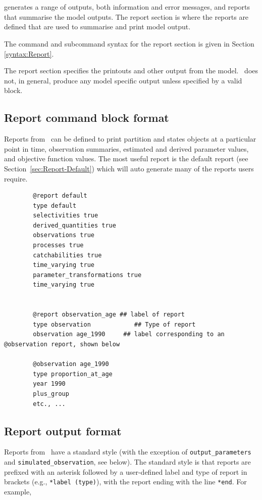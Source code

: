 \section{\label{sec:Report}}

\CNAME generates a range of outputs, both information and error messages, and reports that summarise the model outputs. The report section is where the reports are defined that are used to summarise and print model output. 

The command and subcommand syntax for the report section is given in Section \ref{syntax:Report}.

The report section specifies the printouts and other output from the model. \CNAME\ does not, in general, produce any model specific output unless specified by a valid  block.

\subsection{Report command block format}

Reports from \CNAME\ can be defined to print partition and states objects at a particular point in time, observation summaries, estimated and derived parameter values, and objective function values. The most useful report is the default report (see Section~\ref{sec:Report-Default}) which will auto generate many of the reports users require.

\begin{verbatim}
		@report default
		type default
		selectivities true
		derived_quantities true
		observations true
		processes true
		catchabilities true
		time_varying true
		parameter_transformations true
		time_varying true
		
		
		@report observation_age ## label of report
		type observation		    ## Type of report
		observation age_1990	 ## label corresponding to an @observation report, shown below

		@observation age_1990
		type proportion_at_age
		year 1990
		plus_group
		etc., ...
\end{verbatim}

\subsection{Report output format}

Reports from \CNAME\ have a standard style (with the exception of \texttt{output\_parameters} and \texttt{simulated\_observation}, see below). The standard style is that reports are prefixed with an asterisk followed by a user-defined label and type of report in brackets (e.g., \texttt{*label (type)}), with the report ending with the line \texttt{*end}. For example,

